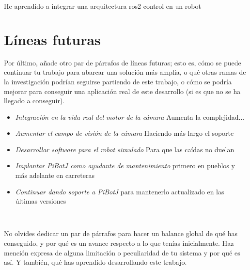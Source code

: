 He aprendido a integrar  una arquitectura ros2 control en un robot

\section{Líneas futuras}


Por último, añade otro par de párrafos de líneas futuras; esto es, cómo se puede continuar tu trabajo para abarcar una solución más amplia, o qué otras ramas de la investigación podrían seguirse partiendo de este trabajo, o cómo se podría mejorar para conseguir una aplicación real de este desarrollo (si es que no se ha llegado a conseguir).


\begin{itemize}
	\item \textit{Integración en la vida real del motor de la cámara} Aumenta la complejidad...
	\item \textit{Aumentar el campo de visión de la cámara} Haciendo más largo el soporte
	\item \textit{Desarrollar software para el robot simulado} Para que las caídas no duelan
	\item \textit{Implantar PiBotJ como ayudante de mantenimiento} primero en pueblos y más adelante en carreteras
	\item \textit{Continuar dando soporte a PiBotJ} para mantenerlo actualizado en las últimas versiones
\end{itemize}\

No olvides dedicar un par de párrafos para hacer un balance global de qué has conseguido, y por qué es un avance respecto a lo que tenías inicialmente. Haz mención expresa de alguna limitación o peculiaridad de tu sistema y por qué es así. Y también, qué has aprendido desarrollando este trabajo.\\
